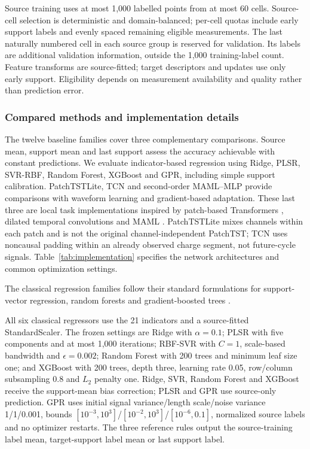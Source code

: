 \documentclass[preprint,12pt]{elsarticle}
\begin{document}
Source training uses at most 1,000 labelled points from at most 60 cells. Source-cell selection is deterministic and domain-balanced; per-cell quotas include early support labels and evenly spaced remaining eligible measurements. The last naturally numbered cell in each source group is reserved for validation. Its labels are additional validation information, outside the 1,000 training-label count. Feature transforms are source-fitted; target descriptors and updates use only early support. Eligibility depends on measurement availability and quality rather than prediction error.

\subsubsection{Compared methods and implementation details}
The twelve baseline families cover three complementary comparisons. Source mean, support mean and last support assess the accuracy achievable with constant predictions. We evaluate indicator-based regression using Ridge, PLSR, SVR-RBF, Random Forest, XGBoost and GPR, including simple support calibration. PatchTSTLite, TCN and second-order MAML--MLP provide comparisons with waveform learning and gradient-based adaptation. These last three are local task implementations inspired by patch-based Transformers \citep{nie2023}, dilated temporal convolutions \citep{bai2018} and MAML \citep{finn2017}. PatchTSTLite mixes channels within each patch and is not the original channel-independent PatchTST; TCN uses noncausal padding within an already observed charge segment, not future-cycle signals. Table~\ref{tab:implementation} specifies the network architectures and common optimization settings.



The classical regression families follow their standard formulations for support-vector regression, random forests and gradient-boosted trees \citep{cortes1995,breiman2001,chen2016}.

All six classical regressors use the 21 indicators and a source-fitted StandardScaler. The frozen settings are Ridge with $\alpha=0.1$; PLSR with five components and at most 1,000 iterations; RBF-SVR with $C=1$, scale-based bandwidth and $\epsilon=0.002$; Random Forest with 200 trees and minimum leaf size one; and XGBoost with 200 trees, depth three, learning rate 0.05, row/column subsampling 0.8 and $L_2$ penalty one. Ridge, SVR, Random Forest and XGBoost receive the support-mean bias correction; PLSR and GPR use source-only prediction. GPR uses initial signal variance/length scale/noise variance 1/1/0.001, bounds $[10^{-3},10^3]$/$[10^{-2},10^3]$/$[10^{-6},0.1]$, normalized source labels and no optimizer restarts. The three reference rules output the source-training label mean, target-support label mean or last support label.
\end{document}
